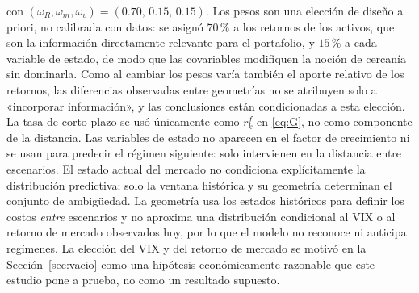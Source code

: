 con $(\omega_R,\omega_m,\omega_v)=(0.70,\,0.15,\,0.15)$. Los pesos son una elección de diseño a priori, no calibrada con datos: se asignó $70\,\%$ a los retornos de los activos, que son la información directamente relevante para el portafolio, y $15\,\%$ a cada variable de estado, de modo que las covariables modifiquen la noción de cercanía sin dominarla. Como al cambiar los pesos varía también el aporte relativo de los retornos, las diferencias observadas entre geometrías no se atribuyen solo a «incorporar información», y las conclusiones están condicionadas a esta elección.
 La tasa de corto plazo se usó únicamente como $r^f_k$ en \eqref{eq:G}, no como componente de la distancia.
Las variables de estado no aparecen en el factor de crecimiento ni se usan para predecir el régimen siguiente: solo intervienen en la distancia entre escenarios. El estado actual del mercado no condiciona explícitamente la distribución predictiva; solo la ventana histórica y su geometría determinan el conjunto de ambigüedad. La geometría usa los estados históricos para definir los costos \emph{entre} escenarios y no aproxima una distribución condicional al VIX o al retorno de mercado observados hoy, por lo que el modelo no reconoce ni anticipa regímenes. La elección del VIX y del retorno de mercado se motivó en la Sección~\ref{sec:vacio} \citep{whaley2000,french1987} como una hipótesis económicamente razonable que este estudio pone a prueba, no como un resultado supuesto.


